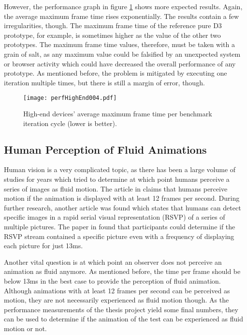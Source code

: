 However, the performance graph in figure \ref{fig:perfHighEnd004} shows more expected results. Again, the average maximum frame time rises exponentially. The results contain a few irregularities, though. The maximum frame time of the reference pure D3 prototype, for example, is sometimes higher as the value of the other two prototypes. The maximum frame time values, therefore, must be taken with a grain of salt, as any maximum value could be falsified by an unexpected system or browser activity which could have decreased the overall performance of any prototype. As mentioned before, the problem is mitigated by executing one iteration multiple times, but there is still a margin of error, though.

\begin{figure}
\centering
\texttt{[image: perfHighEnd004.pdf]}
\caption{High-end devices' average maximum frame time per benchmark iteration cycle (lower is better).}
\label{fig:perfHighEnd004}
\end{figure}

\subsection{Human Perception of Fluid Animations}
\label{sub:humanPerception}


Human vision is a very complicated topic, as there has been a large volume of studies for years which tried to determine at which point humans perceive a series of images as fluid motion. The article in \cite{RestorationOfMotionPictureFilm} claims that humans perceive motion if the animation is displayed with at least 12 frames per second. During further research, another article was found which states that humans can detect specific images in a rapid serial visual representation (RSVP) of a series of multiple pictures. The paper in \cite{Potter2014} found that participants could determine if the RSVP stream contained a specific picture even with a frequency of displaying each picture for just 13ms. 

Another vital question is at which point an observer does not perceive an animation as fluid anymore. As mentioned before, the time per frame should be below 13ms in the best case to provide the perception of fluid animation. Although animations with at least 12 frames per second can be perceived as motion, they are not necessarily experienced as fluid motion though. As the performance measurements of the thesis project yield some final numbers, they can be used to determine if the animation of the test can be experienced as fluid motion or not.

